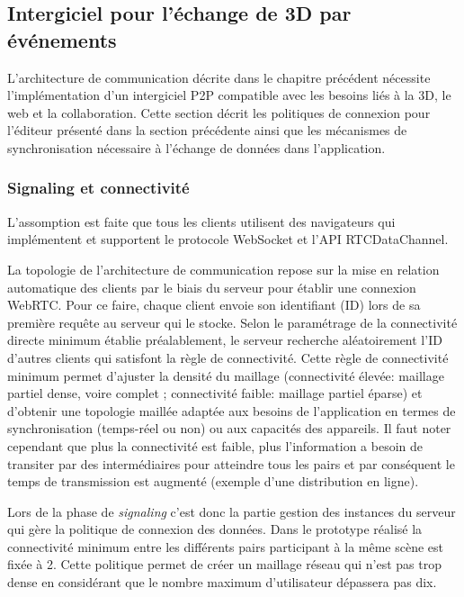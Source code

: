 \subsection{Intergiciel pour l'échange de 3D par événements}

L'architecture de communication décrite dans le chapitre précédent nécessite 
l'implémentation d'un intergiciel \gls{P2P} compatible avec les besoins liés à la 
3D, le web et la collaboration. Cette section décrit les politiques de connexion 
pour l'éditeur présenté dans la section précédente ainsi que les mécanismes de 
synchronisation nécessaire à l'échange de données dans l'application. 

\subsubsection{Signaling et connectivité}
L'assomption est faite que tous les clients utilisent des navigateurs qui 
implémentent et supportent le protocole WebSocket et l'\gls{API} 
RTCDataChannel. 

La topologie de l'architecture de communication repose sur la mise en relation 
automatique des clients par le biais du serveur pour établir une connexion 
\gls{WebRTC}. Pour ce faire, chaque client envoie son identifiant (ID) lors de sa 
première requête au serveur qui le stocke. Selon le paramétrage de la connectivité 
directe minimum établie préalablement, le serveur recherche aléatoirement l'ID 
d'autres clients qui satisfont la règle de connectivité. Cette règle de connectivité 
minimum permet d'ajuster la densité du maillage (connectivité élevée: maillage 
partiel dense, voire complet ; connectivité faible: maillage partiel éparse) et 
d'obtenir une topologie maillée adaptée aux besoins de l'application en termes de 
synchronisation (temps-réel ou non) ou aux capacités des appareils. Il faut noter 
cependant que plus la connectivité est faible, plus l'information a besoin de 
transiter par des intermédiaires pour atteindre tous les pairs et par conséquent le 
temps de transmission est augmenté (exemple d'une distribution en ligne). 


Lors de la phase de \textit{signaling} c'est donc la partie gestion des instances du 
serveur qui gère la politique de connexion des données. Dans le prototype réalisé 
la connectivité minimum entre les différents pairs participant à la même scène est 
fixée à 2. Cette politique permet de créer un maillage réseau qui n'est pas trop 
dense en considérant que le nombre maximum d'utilisateur dépassera pas dix.

